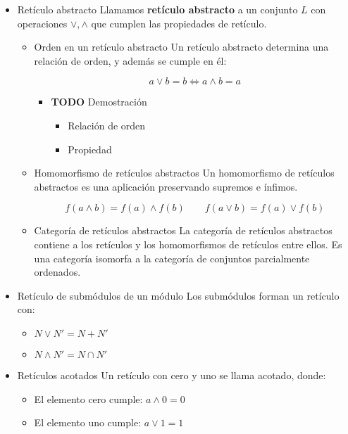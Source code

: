 \documentclass[11pt]{article}
\begin{document}
\begin{itemize}
\item Retículo abstracto
\label{sec-7-2-3-4}
Llamamos \textbf{retículo abstracto} a un conjunto $L$ con operaciones $\vee,\wedge$ que
cumplen las propiedades de retículo.

\begin{itemize}
\item Orden en un retículo abstracto
\label{sec-7-2-3-4-1}
Un retículo abstracto determina una relación de orden, y además
se cumple en él:

\[
a \vee b = b \iff a \wedge b = a
\]

\begin{itemize}
\item {\bfseries\sffamily TODO} Demostración
\label{sec-7-2-3-4-1-1}
\begin{itemize}
\item Relación de orden
\label{sec-7-2-3-4-1-1-1}
\item Propiedad
\label{sec-7-2-3-4-1-1-2}
\end{itemize}
\end{itemize}
\item Homomorfismo de retículos abstractos
\label{sec-7-2-3-4-2}
Un homomorfismo de retículos abstractos es una aplicación preservando
supremos e ínfimos.

\[
f(a\wedge b) = f(a) \wedge f(b) \qquad f(a\vee b) = f(a) \vee f(b)
\]

\item Categoría de retículos abstractos
\label{sec-7-2-3-4-3}
La categoría de retículos abstractos contiene a los retículos y los
homomorfismos de retículos entre ellos. Es una categoría isomorfa
a la categoría de conjuntos parcialmente ordenados.
\end{itemize}

\item Retículo de submódulos de un módulo
\label{sec-7-2-3-5}
Los submódulos forman un retículo con:

\begin{itemize}
\item $N \vee N' = N + N'$
\item $N \wedge N' = N \cap N'$
\end{itemize}

\item Retículos acotados
\label{sec-7-2-3-6}
Un retículo con cero y uno se llama acotado, donde:

\begin{itemize}
\item El elemento cero cumple: $a \wedge 0 = 0$
\item El elemento uno cumple:  $a \vee 1 = 1$
\end{itemize}


\end{itemize}
\end{document}
